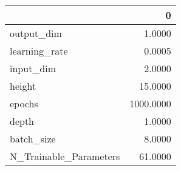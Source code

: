 \begin{tabular}{lr}
\toprule
{} &          0 \\
\midrule
output\_dim             &     1.0000 \\
learning\_rate          &     0.0005 \\
input\_dim              &     2.0000 \\
height                 &    15.0000 \\
epochs                 &  1000.0000 \\
depth                  &     1.0000 \\
batch\_size             &     8.0000 \\
N\_Trainable\_Parameters &    61.0000 \\
\bottomrule
\end{tabular}
